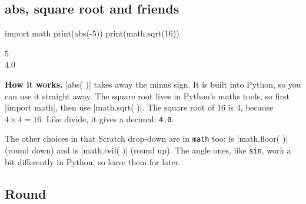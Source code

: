 \subsection*{abs, square root and friends}

\begin{tcbraster}[raster columns=2, raster equal height=rows, raster column skip=12pt, raster valign=center, raster force size=false, raster odd column/.style={add to width=-1.2cm}, raster even column/.style={add to width=1.2cm}]
\begin{tcolorbox}[colback=white, colframe=white, boxrule=0pt, valign=center]
\begin{scratch}
\end{scratch}
\end{tcolorbox}
\begin{tcolorbox}[colback=white, colframe=white, boxrule=0pt, left=0pt, right=0pt, top=0pt, bottom=0pt, valign=center]
\begin{code}
import math
print(abs(-5))
print(math.sqrt(16))
\end{code}
\begin{outputbox}
5\\
4.0
\end{outputbox}
\end{tcolorbox}
\end{tcbraster}

\textbf{How it works.} \py|abs( )| takes away the minus sign. It is built into Python, so you can use it straight away. The square root lives in Python's maths tools, so first \py|import math|, then use \py|math.sqrt( )|. The square root of 16 is 4, because $4 \times 4 = 16$. Like divide, it gives a decimal: \texttt{4.0}.

The other choices in that Scratch drop-down are in \texttt{math} too:  is \py|math.floor( )| (round down) and  is \py|math.ceil( )| (round up). The angle ones, like \texttt{sin}, work a bit differently in Python, so leave them for later.

\subsection*{Round}

